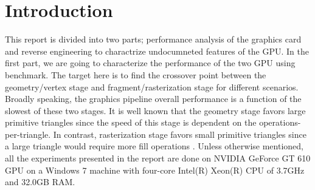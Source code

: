 \section{Introduction}
This report is divided into two parts; performance analysis of the graphics card and reverse engineering to charactrize undocumneted features of the GPU. In the first part, we are going to characterize the performance of the two GPU using \protect{\wes} benchmark. The target here is to find the crossover point between the geometry/vertex stage and fragment/rasterization stage for different scenarios. Broadly speaking, the graphics pipeline overall performance is a function of the slowest of these two stages. It is well known that the geometry stage favors large primitive triangles since the speed of this stage is dependent on the operations-per-triangle. In contrast, rasterization stage favors small primitive triangles since a large triangle would require more fill operations \cite{Bethel_2010}. Unless otherwise mentioned, all the experiments presented in the report are done on NVIDIA GeForce GT 610 GPU on a Windows 7 machine with four-core Intel(R) Xeon(R) CPU of 3.7GHz and 32.0GB RAM. 

